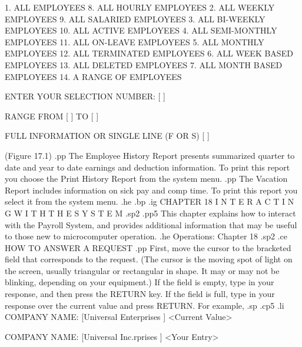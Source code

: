     1. ALL EMPLOYEES			8. ALL HOURLY EMPLOYEES
    2. ALL WEEKLY EMPLOYEES		9. ALL SALARIED EMPLOYEES
    3. ALL BI-WEEKLY EMPLOYEES	       10. ALL ACTIVE EMPLOYEES
    4. ALL SEMI-MONTHLY EMPLOYEES      11. ALL ON-LEAVE EMPLOYEES
    5. ALL MONTHLY EMPLOYEES	       12. ALL TERMINATED EMPLOYEES
    6. ALL WEEK BASED EMPLOYEES        13. ALL DELETED EMPLOYEES
    7. ALL MONTH BASED EMPLOYEES       14. A RANGE OF EMPLOYEES

	       ENTER YOUR SELECTION NUMBER: [  ]

	       RANGE FROM [	] TO [	   ]

	       FULL INFORMATION OR SINGLE LINE (F OR S) [ ]

			  (Figure 17.1)
.pp
The Employee History Report presents summarized quarter to date and
year to date earnings and deduction information.  To print this report
you choose the Print History Report from the system menu.
.pp
The Vacation Report includes information on sick pay and comp time.
To print this report you select it from the system menu.
.he
.bp
.ig
CHAPTER 18
I N T E R A C T I N G	 W I T H    T H E    S Y S T E M
.sp2
.pp5
This chapter explains how to interact with
the Payroll System, and provides
additional information that may be useful to
those new to microcomputer operation.
.he Operations: Chapter 18
.sp2
.ce
HOW TO ANSWER A REQUEST
.pp
First, move the cursor to the bracketed field that corresponds to
the request.  (The cursor is the moving spot of light on the screen,
usually triangular or rectangular in shape.  It may or may not be
blinking, depending on your equipment.)  If the field is empty,
type in your response, and then press the RETURN key.
If the field is full, type in your response over the current value
and press RETURN.  For example,
.sp
.cp5
.li
    COMPANY NAME: [Universal Enterprises       ]  <Current Value>

    COMPANY NAME: [Universal Inc.rprises       ]  <Your Entry>

